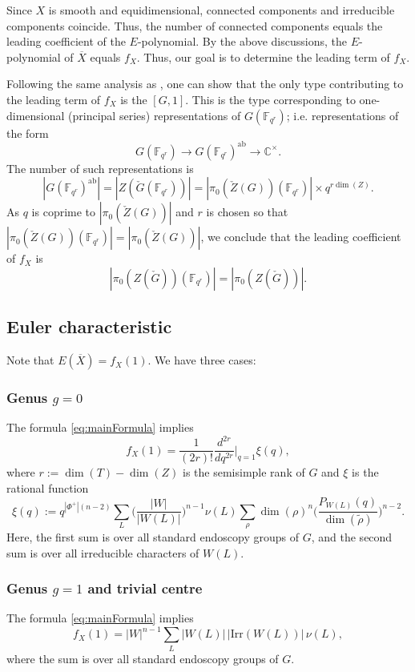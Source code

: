 \documentclass[12pt]{amsart}
\theoremstyle{plain}
\theoremstyle{definition}
\theoremstyle{remark}
\newcommand{\ra}{\rightarrow}
\newcommand{\bCt}{\mathbb{C}^\times}
\newcommand{\Irr}{\mathrm{Irr}}
\newcommand{\Fqr}{\mathbb{F}_{q^r}}
\begin{document}
Since $X$ is smooth and equidimensional, connected components and irreducible components coincide. Thus, the number of connected components equals the leading coefficient of the $E$-polynomial. By the above discussions, the $E$-polynomial of $\overline{X}$ equals $f_X$. Thus, our goal is to determine the leading term of $f_X$. 

Following the same analysis as \cite[Corollary 5]{BK22}, one can show that  the only type contributing to the leading term of $f_X$ is the $[G, 1]$. This is the type corresponding to one-dimensional (principal series) representations of $G(\Fqr)$; i.e. representations of the form 
\[
G(\Fqr) \ra G(\Fqr)^{\mathrm{ab}} \ra \bCt.
\]
The number of such representations is 
\[
|G(\Fqr)^{\mathrm{ab}}| = |Z(\check{G}(\Fqr))| = |\pi_0(\check{Z}(G))(\Fqr)|\times q^{r\dim(Z)}. 
\]
As $q$ is  coprime to $|\pi_0(\check{Z}(G))|$ and $r$ is chosen so that $|\pi_0(\check{Z}(G))(\Fqr)|=|\pi_0(\check{Z}(G))|$,  we conclude that the leading coefficient of $f_X$ is 
\[
|\pi_0(Z(\check{G}))(\Fqr)|=|\pi_0(Z(\check{G}))|. 
\]
\newpage

\subsection{Euler characteristic} \label{s:EulerX} Note that $E(\overline{X})=f_X(1)$. 
We have three cases: 

\subsubsection{Genus $g=0$}  The formula \ref{eq:mainFormula} implies 
\[
f_X(1) = \frac{1}{(2r)!} \frac{d^{2r}}{dq^{2r}} \bigg|_{q=1} \xi(q),
\]
where $r:=\dim(T)-\dim(Z)$ is the semisimple rank of $G$ and $\xi$ is the rational function
\[
\xi(q) := q^{|\Phi^+|(n-2)} \sum_{L} \bigg(\frac{|W|}{|W(L)|}\bigg)^{n-1} \nu(L) \sum_{\rho} \dim(\rho)^n \bigg(\frac{P_{W(L)}(q)}{\dim(\tilde{\rho})}\bigg)^{n-2}.
\]
Here, the first sum is over all standard endoscopy groups of $G$, and the second sum is over all irreducible characters of $W(L)$. 


\subsubsection{Genus $g=1$ and trivial centre}
The formula \eqref{eq:mainFormula} implies
\[
f_X(1) = |W|^{n-1} \sum_{L} |W(L)|\, |\Irr(W(L))|\, \nu(L),
\]
where the sum is over all standard endoscopy groups of $G$. 
\end{document}
